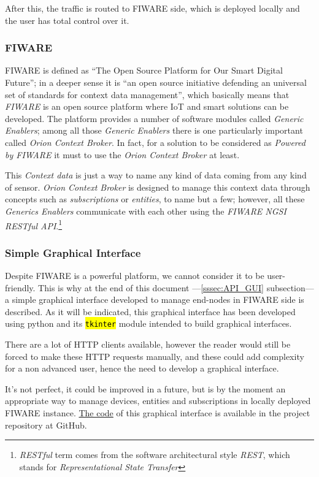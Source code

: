 \documentclass[11pt,a4paper,dvipsnames,twoside]{article}
\newcommand{\cmd}[1] {\hl{\texttt{#1}}}
\begin{document}
After this, the traffic is routed to FIWARE side, which is deployed locally and the user has total control over it.

\subsubsection{FIWARE}
FIWARE is defined as \enquote{The Open Source Platform for Our Smart Digital Future}\cite{FIWARE}; in a deeper sense it is \enquote{an open source initiative defending an universal set of standards for context data management}\cite{FIWARE}, which basically means that \textit{FIWARE} is an open source platform where IoT and smart solutions can be developed. The platform provides a number of software modules called \textit{Generic Enablers}; among all those \textit{Generic Enablers} there is one particularly important called \textit{Orion Context Broker}. In fact, for a solution to be considered as \textit{Powered by FIWARE} it must to use the \textit{Orion Context Broker} at least. 

This \textit{Context data} is just a way to name any kind of data coming from any kind of sensor. \textit{Orion Context Broker} is designed to manage this context data through concepts such as \textit{subscriptions} or \textit{entities}, to name but a few; however, all these \textit{Generics Enablers} communicate with each other using the \textit{FIWARE NGSI RESTful API}\cite{NGSI}.\footnote{\textit{RESTful} term comes from the software architectural style \textit{REST}, which stands for \textit{Representational State Transfer}}

\subsubsection{Simple Graphical Interface}
Despite FIWARE is a powerful platform, we cannot consider it to be user-friendly. This is why at the end of this document ---\ref{sssec:API_GUI} subsection--- a simple graphical interface developed to manage end-nodes in FIWARE side is described. As it will be indicated, this graphical interface has been developed using python and its \cmd{tkinter} module intended to build graphical interfaces.

There are a lot of HTTP clients available, however the reader would still be forced to make these HTTP requests manually, and these could add complexity for a non advanced user, hence the need to develop a graphical interface.

It's not perfect, it could be improved in a future, but is by the moment an appropriate way to manage devices, entities and subscriptions in locally deployed FIWARE instance. \href{https://github.com/WyRe/lora-arduino-dendrometer/blob/master/src/api-gui/api-gui.py}{The code} of this graphical interface is available in the project repository at GitHub.
\end{document}

